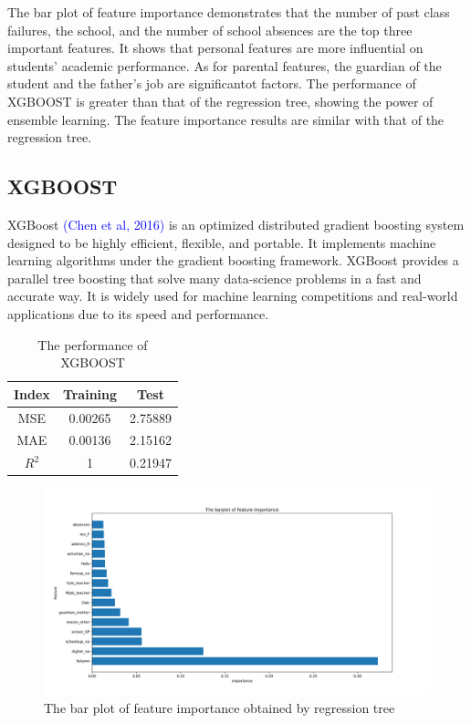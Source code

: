 \documentclass[sn-mathphys-num]{sn-jnl}%
\theoremstyle{thmstyleone}%
\theoremstyle{thmstyletwo}%
\theoremstyle{thmstylethree}%
\begin{document}
The bar plot of feature importance demonstrates that the number of past class failures, the school, and the number of school absences are the top three important features. It shows that personal features are more influential on students' academic performance. As for parental features, the guardian of the student and the father's job are significantot factors. The performance of XGBOOST is greater than that of the regression tree, showing the power of ensemble learning. The feature importance results are similar with that of the regression tree.







\subsection{XGBOOST}


XGBoost \textcolor{blue}{(Chen et al, 2016)} is an optimized distributed gradient boosting system designed to be highly efficient, flexible, and portable. It implements machine learning algorithms under the gradient boosting framework. XGBoost provides a parallel tree boosting that solve many data-science problems in a fast and accurate way. It is widely used for machine learning competitions and real-world applications due to its speed and performance.


\begin{table}[h]
  \centering
  \caption{The performance of XGBOOST}
  \begin{tabular}{c|c|c}
  \hline
   Index  &  Training  & Test\\
   \hline
   MSE  &  0.00265  & 2.75889\\
   \hline
   MAE  &  0.00136  & 2.15162\\
   \hline
   $R^2$  &  1  & 0.21947 \\
   \hline
  \end{tabular}
\end{table}

\begin{figure}[h]
    \centering
    \includegraphics[width=\textwidth]{figure/feature_importance_xgboost.png}
    \caption{The bar plot of feature importance obtained by regression tree}
\end{figure}
\end{document}
